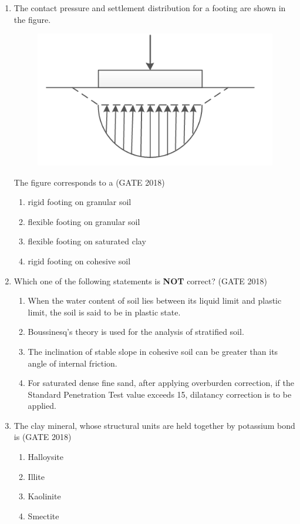 \documentclass[journal,12pt,onecolumn]{IEEEtran}
\theoremstyle{remark}
\begin{document}
\begin{enumerate}
\item The contact pressure and settlement distribution for a footing are shown in the figure.
\begin{figure}[h]
    \centering
    \includegraphics[width=0.5\linewidth]{GATE-CE-2018/9-2.png}
    \caption{}
    \label{9-2}
\end{figure}
The figure corresponds to a
\hfill{(GATE 2018)}
\begin{multicols}{4}
\begin{enumerate}
    \item rigid footing on granular soil
    \item flexible footing on granular soil
    \item flexible footing on saturated clay
    \item rigid footing on cohesive soil
\end{enumerate}
\end{multicols}
\vspace{1cm}
\newpage
\item Which one of the following statements is \textbf{NOT} correct?
\hfill{(GATE 2018)}
\begin{enumerate}
    \item When the water content of soil lies between its liquid limit and plastic limit, the soil is said to be in plastic state.
    \item Boussinesq's theory is used for the analysis of stratified soil.
    \item The inclination of stable slope in cohesive soil can be greater than its angle of internal friction.
    \item For saturated dense fine sand, after applying overburden correction, if the Standard Penetration Test value exceeds 15, dilatancy correction is to be applied.
\end{enumerate}
\vspace{1cm}

\item The clay mineral, whose structural units are held together by potassium bond is
\hfill{(GATE 2018)}
\begin{multicols}{4}
\begin{enumerate}
    \item Halloysite
    \item Illite
    \item Kaolinite
    \item Smectite
\end{enumerate}
\end{multicols}
\vspace{1cm}


\end{enumerate}
\end{document}
